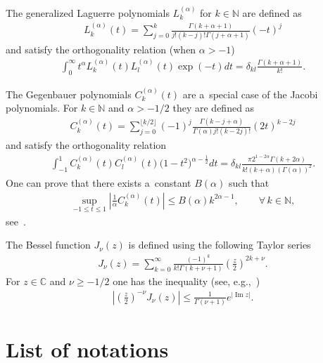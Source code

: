 \documentclass[pdftex]{sigma}
\numberwithin{equation}{section}
\numberwithin{theorem}{section}
\numberwithin{proposition}{section}
\numberwithin{lemma}{section}
\numberwithin{corollary}{section}
\numberwithin{definition}{section}
\numberwithin{example}{section}
\numberwithin{remark}{section}
\numberwithin{note}{section}
\theoremstyle{remark}
\newcommand{\mC}{\mathbb{C}}
\newcommand{\mN}{\mathbb{N}}
\def\a{{\alpha}}
\begin{document}
The generalized Laguerre polynomials $L_k^{(\alpha)}$ for $k\in\mN$ are def\/ined as
\begin{gather*}%
L_k^{(\alpha)}(t)=\sum_{j=0}^{k}\frac{\Gamma(k+\alpha+1)}{j!(k-j)!\Gamma(j+\alpha+1)}(-t)^j
\end{gather*}
and satisfy the orthogonality relation (when $\alpha>-1$)
\begin{gather*}
\int_{0}^\infty t^{\alpha}
L^{(\alpha)}_k(t)L^{(\alpha)}_l(t)\exp(-t)dt=\delta_{kl}\frac{\Gamma(k+\alpha+1)}{k!}.
\end{gather*}

The Gegenbauer polynomials $C^{(\alpha)}_k(t)$ are a~special case of the Jacobi polynomials.
For $k\in\mN$ and $\alpha>-1/2$ they are def\/ined as
\begin{gather*}
C_k^{(\alpha)}(t)=\sum_{j=0}^{\lfloor
k/2\rfloor}(-1)^j\frac{\Gamma(k-j+\alpha)}{\Gamma(\alpha)j!(k-2j)!}(2t)^{k-2j}
\end{gather*}
and satisfy the orthogonality relation
\begin{gather*}
\int_{-1}^1C_k^{(\alpha)}(t)C_l^{(\alpha)}(t)\big(1-t^2\big)^{\alpha-\frac{1}{2}}dt=\delta_{kl}\frac{\pi2^{1
-2\alpha}\Gamma(k+2\alpha)}{k!(k+\alpha)(\Gamma(\alpha))^2}.
\end{gather*}
One can prove that there exists a~constant $B(\a)$ such that
\begin{gather}\label{estimateGeg}
\sup_{-1\leq t\leq1}\left|\frac{1}{\a}C_k^{(\alpha)}(t)\right|\leq B(\a)k^{2\a-1},\qquad
\forall\, k\in\mN,
\end{gather}
see~\cite[Lemma 4.9]{Orsted2}.

The Bessel function $J_{\nu}(z)$ is def\/ined using the following Taylor series
\begin{gather*}
J_{\nu}(z)=\sum_{k=0}^\infty\frac{(-1)^k}{k!\Gamma(k+\nu+1)}
{\left({\frac{z}{2}}\right)}^{2k+\nu}.
\end{gather*}
For $z\in\mC$ and $\nu\geq-1/2$ one has the inequality (see, e.g.,~\cite{Sz})
\begin{gather}\label{estimateBessel}
\left|\left(\frac{z}{2}\right)^{-\nu}J_{\nu}(z)\right|\leq\frac{1}{\Gamma(\nu+1)}e^{|\operatorname{Im}{z}|}.
\end{gather}

\section{List of notations}\label{appendixB}
\end{document}
